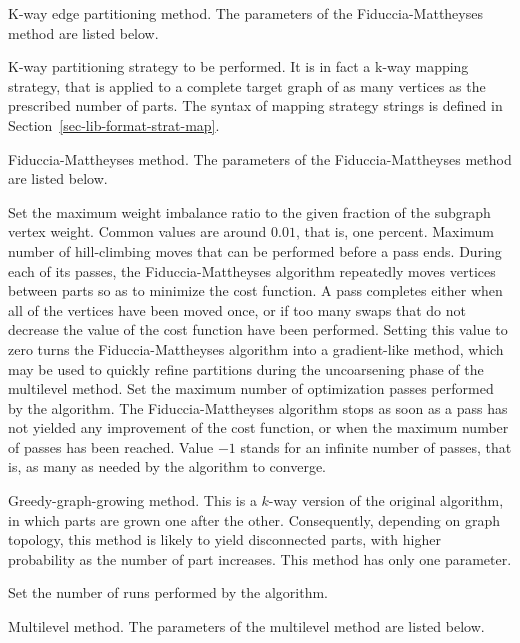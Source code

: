 \begin{itemize}
\iteme[{\tt e}]
K-way edge partitioning method. The parameters of the Fiduccia-Mattheyses method
are listed below.
\begin{itemize}
\iteme[{\tt strat=}{\it strat}]
K-way partitioning strategy to be performed. It is in fact a k-way
mapping strategy, that is applied to a complete target graph of as
many vertices as the prescribed number of parts. The syntax of mapping
strategy strings is defined in Section~\ref{sec-lib-format-strat-map}.
\end{itemize}
\iteme[{\tt f}]
Fiduccia-Mattheyses method. The parameters of the Fiduccia-Mattheyses method
are listed below.
\begin{itemize}
\iteme[{\tt bal=}{\it rat}]
Set the maximum weight imbalance ratio to the given fraction of
the subgraph vertex weight. Common values are around $0.01$, that
is, one percent.
\iteme[{\tt move=}{\it nbr}]
Maximum number of hill-climbing moves that can be performed before a
pass ends. During each of its passes, the Fiduccia-Mattheyses
algorithm repeatedly moves vertices between parts so as to
minimize the cost function. A pass completes either when all of the
vertices have been moved once, or if too many swaps that do not
decrease the value of the cost function have been performed. Setting
this value to zero turns the Fiduccia-Mattheyses algorithm into a
gradient-like method, which may be used to quickly refine partitions
during the uncoarsening phase of the multilevel method.
\iteme[{\tt pass=}{\it nbr}]
Set the maximum number of optimization passes performed by the
algorithm. The Fiduccia-Mattheyses algorithm stops as soon as a pass
has not yielded any improvement of the cost function, or when the
maximum number of passes has been reached. Value $-1$ stands for an
infinite number of passes, that is, as many as needed by the algorithm
to converge.
\end{itemize}
\iteme[{\tt h}]
Greedy-graph-growing method. This is a $k$-way version of the
original algorithm, in which parts are grown one after the
other. Consequently, depending on graph topology, this method is
likely to yield disconnected parts, with higher probability as the
number of part increases. This method has only one parameter.
\begin{itemize}
\iteme[{\tt pass=}{\it nbr}]
Set the number of runs performed by the algorithm.
\end{itemize}
\iteme[{\tt m}]
Multilevel method. The parameters of the multilevel method are listed below.
\begin{itemize}

\end{itemize}
\end{itemize}
